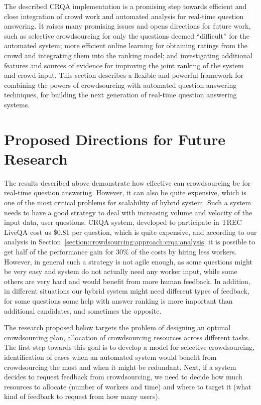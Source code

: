 The described CRQA implementation is a promising step towards efficient and close integration of crowd work and automated analysis for real-time question answering.
It raises many promising issues and opens directions for future work, such as selective crowdsourcing for only the questions deemed ``difficult'' for the automated system; more efficient online learning for obtaining ratings from the crowd and integrating them into the ranking model; and investigating additional features and sources of evidence for improving the joint ranking of the system and crowd input.
This section describes a flexible and powerful framework for combining the powers of crowdsourcing with automated question answering techniques, for building the next generation of real-time question answering systems.

\section{Proposed Directions for Future Research}
\label{section:crowdsourcing:proposal}

The results described above demonstrate how effective can crowdsourcing be for real-time question answering.
However, it can also be quite expensive, which is one of the most critical problems for scalability of hybrid system.
Such a system needs to have a good strategy to deal with increasing volume and velocity of the input data, \ie user questions.
CRQA system, developed to participate in TREC LiveQA cost us \$0.81 per question, which is quite expensive, and according to our analysis in Section~\ref{section:crowdsourcing:approach:crqa:analysis} it is possible to get half of the performance gain for 30\% of the costs by hiring less workers.
However, in general such a strategy is not agile enough, as some questions might be very easy and system do not actually need any worker input, while some others are very hard and would benefit from more human feedback.
In addition, in different situations our hybrid system might need different types of feedback, \eg for some questions some help with answer ranking is more important than additional candidates, and sometimes the opposite.

The research proposed below targets the problem of designing an optimal crowdsourcing plan, \ie allocation of crowdsourcing resources across different tasks.
The first step towards this goal is to develop a model for selective crowdsourcing, \ie identification of cases when an automated system would benefit from crowdsourcing the most and when it might be redundant.
Next, if a system decides to request feedback from crowdsourcing, we need to decide how much resources to allocate (number of workers and time) and where to target it (what kind of feedback to request from how many users).

